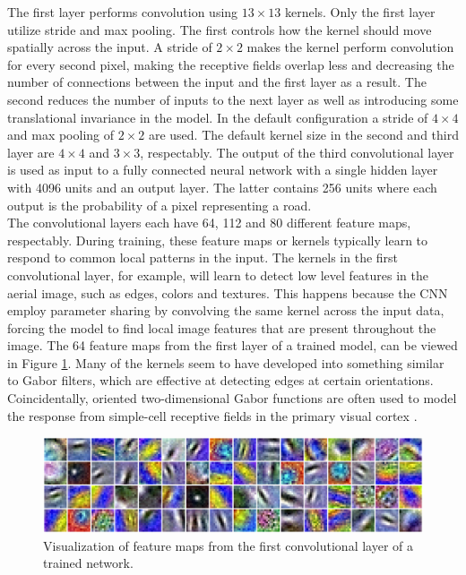 The first layer performs convolution using $13 \times 13$ kernels. Only the first layer utilize stride and max pooling. The first controls how the kernel should move spatially across the input. A stride of $2 \times 2$ makes the kernel perform convolution for every second pixel, making the receptive fields overlap less and decreasing the number of connections between the input and the first layer as a result. The second reduces the number of inputs to the next layer as well as introducing some translational invariance in the model. In the default configuration a stride of $4 \times 4$ and max pooling of $2 \times 2$ are used. The default kernel size in the second and third layer are $4 \times 4$ and $3 \times 3$, respectably. The output of the third convolutional layer is used as input to a fully connected neural network with a single hidden layer with 4096 units and an output layer. The latter contains 256 units where each output is the probability of a pixel representing a road.\\


The convolutional layers each have 64, 112 and 80 different feature maps, respectably. During training, these feature maps or kernels typically learn to respond to common local patterns in the input. The kernels in the first convolutional layer, for example, will learn to detect low level features in the aerial image, such as edges, colors and textures. This happens because the \ac{CNN} employ parameter sharing by convolving the same kernel across the input data, forcing the model to find local image features that are present throughout the image. The 64 feature maps from the first layer of a trained model, can be viewed in Figure \ref{fig:convoluional_first_layer_visualization}. Many of the kernels seem to have developed into something similar to Gabor filters, which are effective at detecting edges at certain orientations. Coincidentally, oriented two-dimensional Gabor functions are often used to model the response from simple-cell receptive fields in the primary visual cortex \citep{Ringach_gabor_spatial}. \\


\begin{figure}
\begin{center}
\includegraphics[width=1\columnwidth]{figs/network/Filter_unblurred.png}
\caption[Visualization of filter map]{Visualization of feature maps from the first convolutional layer of a trained network.}
\label{fig:convoluional_first_layer_visualization}
\end{center}
\end{figure}

